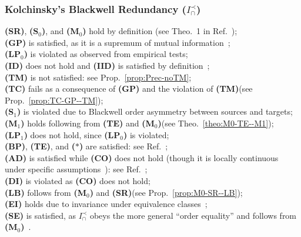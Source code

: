 \documentclass{article}
\newcommand{\ts}[1]{\ensuremath{_{\text{#1}}}}
\newcommand{\SR}{\textbf{(SR)}\xspace} %
\newcommand{\Sz}{\textbf{(S\ts{0})}\xspace} %
\newcommand{\Mz}{\textbf{(M\ts{0})}\xspace} %
\newcommand{\GP}{\textbf{(GP)}\xspace} %
\newcommand{\LPz}{\textbf{(LP\ts{0})}\xspace} %
\newcommand{\ID}{\textbf{(ID)}\xspace} %
\newcommand{\IID}{\textbf{(IID)}\xspace} %
\newcommand{\TM}{\textbf{(TM)}\xspace} %
\newcommand{\TC}{\textbf{(TC)}\xspace} %
\newcommand{\So}{\textbf{(S\ts{1})}\xspace} %
\newcommand{\Mo}{\textbf{(M\ts{1})}\xspace} %
\newcommand{\LPo}{\textbf{(LP\ts{1})}\xspace} %
\newcommand{\BP}{\textbf{(BP)}\xspace} %
\newcommand{\TE}{\textbf{(TE)}\xspace} %
\newcommand{\AST}{\textbf{($\boldsymbol{\ast}$)}\xspace} %
\newcommand{\AD}{\textbf{(AD)}\xspace} %
\newcommand{\CO}{\textbf{(CO)}\xspace} %
\newcommand{\LB}{\textbf{(LB)}\xspace} %
\newcommand{\EI}{\textbf{(EI)}\xspace} %
\newcommand{\SE}{\textbf{(SE)}\xspace} %
\newcommand{\DI}{\textbf{(DI)}\xspace}
\newcommand{\Iprec}{\ensuremath{I_\cap^{\prec}}\xspace}
\begin{document}
\subsubsection*{Kolchinsky's Blackwell Redundancy ($\Iprec$)}
    \SR, \Sz, and \Mz hold by definition (see Theo.~1 in Ref.~\cite{kolchinsky2022novel}); \\
    \GP is satisfied, as it is a supremum of mutual information~\cite{kolchinsky2022novel}; \\
    \LPz is violated as observed from empirical tests; \\
    \ID does not hold and \IID is satisfied by definition~\cite{kolchinsky2022novel}; \\
    \TM is not satisfied: see Prop.~\ref{prop:Prec-noTM}; \\
    \TC fails as a consequence of \GP and the violation of \TM (see Prop.~\ref{prop:TC-GP--TM}); \\
    \So is violated due to Blackwell order asymmetry between sources and targets; \\
    \Mo holds following from \TE and \Mz (see Theo.~\ref{theo:M0-TE--M1}); \\
    \LPo does not hold, since \LPz is violated; \\
    \BP, \TE, and \AST are satisfied: see Ref.~\cite{kolchinsky2022novel}; \\
    \AD is satisfied while \CO does not hold (though it is locally continuous under specific assumptions~\cite{kolchinsky2022novel}): see Ref.~\cite{rauh2023continuity}; \\
    \DI is violated as \CO does not hold; \\
    \LB follows from \Mz and \SR (see Prop.~\ref{prop:M0-SR--LB}); \\
    \EI holds due to invariance under equivalence classes~\cite{li2011connection}; \\
    \SE is satisfied, as \Iprec obeys the more general ``order equality'' and follows from \Mz~\cite{kolchinsky2022novel}. \\
    
\end{document}

